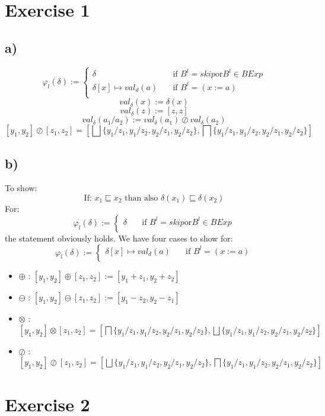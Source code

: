 \documentclass[fleqn,12pt]{article}
\begin{document}
\section*{Exercise 1}
\subsection*{a)}
\[ \varphi_l(\delta) :=
  \begin{cases}
    \delta       & \quad \text{if } B^l = skip \text{or} B^l \in BExp\\
    \delta [x] \mapsto val_d(a) & \quad \text{if } B^l=(x:=a)\\
  \end{cases}
\]
$$val_{\delta}(x):=\delta (x)$$
$$val_{\delta}(z):=[z,z]$$
$$val_{\delta}(a_1/a_2):=val_{\delta}(a_1) \oslash val_{\delta}(a_2)$$
$$[y_1,y_2] \oslash [z_1,z_2]=[\bigsqcup\{y_1/z_1,y_1/z_2,y_2/z_1,y_2/z_2\},\bigsqcap\{y_1/z_1,y_1/z_2,y_2/z_1,y_2/z_2\}]$$
\subsection*{b)}
To show:
$$\text{If: }x_1 \sqsubseteq x_2 \text{ than also } \delta(x_1) \sqsubseteq \delta(x_2)$$
For:
\[ \varphi_l(\delta) :=
  \begin{cases}
    \delta       & \quad \text{if } B^l = skip \text{or} B^l \in BExp\\
  \end{cases}
\]
the statement obviously holds.
We have four cases to show for:
\[ \varphi_l(\delta) :=
  \begin{cases}
    \delta [x] \mapsto val_d(a) & \quad \text{if } B^l=(x:=a)\\
  \end{cases}
\]
\begin{itemize}
	\item{$\oplus$ :} $[y_1,y_2] \oplus [z_1,z_2] := [y_1+z_1,y_2+z_2]$
	\item{$\ominus$ :} $[y_1,y_2] \ominus [z_1,z_2] := [y_1-z_2,y_2-z_1]$
	\item{$\otimes$ :} $[y_1,y_2] \otimes [z_1,z_2]=[\bigsqcap\{y_1/z_1,y_1/z_2,y_2/z_1,y_2/z_2\},\bigsqcup\{y_1/z_1,y_1/z_2,y_2/z_1,y_2/z_2\}]$
	\item{$\oslash$ :} $[y_1,y_2] \oslash [z_1,z_2]=[\bigsqcup\{y_1/z_1,y_1/z_2,y_2/z_1,y_2/z_2\},\bigsqcap\{y_1/z_1,y_1/z_2,y_2/z_1,y_2/z_2\}]$
\end{itemize}

\section*{Exercise 2}
\end{document}
